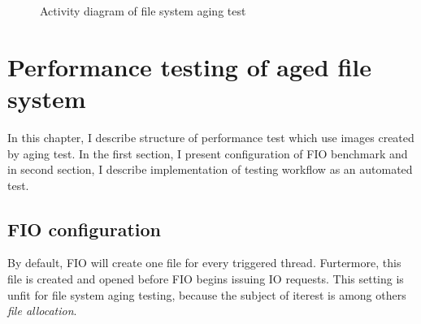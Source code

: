 \documentclass[
  color, %
  table, %
  lof,   %
  lot,   %
]{fithesis3}
\begin{document}
\begin{figure}[ht]
    \centering
    \caption{Activity diagram of file system aging test}
    \label{fig:drift_job_activity}
\end{figure}

\chapter{Performance testing of aged file system}
\label{fio}
In this chapter, I describe structure of performance test which use images created by aging test. In the first section, I present configuration of FIO benchmark and in second section, I describe implementation of testing workflow as an automated test.

\section{FIO configuration} 


By default, FIO will create one file for every triggered thread. Furtermore, this file is created and opened before FIO begins issuing IO requests. This setting is unfit for file system aging testing, because the subject of iterest is among others \emph{file allocation}.
\end{document}
